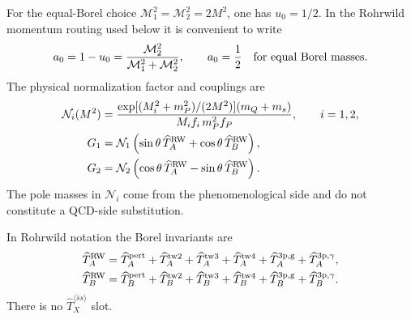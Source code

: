 \documentclass[11pt]{article}
\begin{document}
For the equal-Borel choice
$\mathcal M_1^2=\mathcal M_2^2=2M^2$, one has $u_0=1/2$.  In the
Rohrwild momentum routing used below it is convenient to write
\begin{equation}
 a_0=1-u_0=\frac{\mathcal M_2^2}
 {\mathcal M_1^2+\mathcal M_2^2},\qquad a_0=\frac12
 \quad\hbox{for equal Borel masses}.
 \label{eq:a0-definition}
\end{equation}
The physical normalization factor and couplings are
\begin{align}
 \mathcal N_i(M^2)
 &=\frac{\exp[(M_i^2+m_P^2)/(2M^2)](m_Q+m_s)}
 {M_if_i\,m_P^2f_P},\qquad i=1,2,
 \label{eq:physical-normalization-factor}\\
 G_1&=\mathcal N_1
   \left(\sin\theta\,\widehat T_A^{\rm RW}
        +\cos\theta\,\widehat T_B^{\rm RW}\right),
 \label{eq:paper-final-g1}\\
 G_2&=\mathcal N_2
   \left(\cos\theta\,\widehat T_A^{\rm RW}
        -\sin\theta\,\widehat T_B^{\rm RW}\right).
 \label{eq:paper-final-g2}
\end{align}
The pole masses in $\mathcal N_i$ come from the phenomenological side and do
not constitute a QCD-side substitution.

In Rohrwild notation the Borel invariants are
\begin{align}
 \widehat T_A^{\rm RW}
 &=\widehat T_A^{\rm pert}+\widehat T_A^{\rm tw2}
  +\widehat T_A^{\rm tw3}+\widehat T_A^{\rm tw4}
  +\widehat T_A^{\rm 3p,g}+\widehat T_A^{\rm 3p,\gamma},
 \label{eq:basis-ope-decomposition}\\
 \widehat T_B^{\rm RW}
 &=\widehat T_B^{\rm pert}+\widehat T_B^{\rm tw2}
  +\widehat T_B^{\rm tw3}+\widehat T_B^{\rm tw4}
  +\widehat T_B^{\rm 3p,g}+\widehat T_B^{\rm 3p,\gamma}.
 \label{eq:tensor-ope-decomposition}
\end{align}
There is no $\widehat T_X^{\langle\bar ss\rangle}$ slot.
\end{document}
